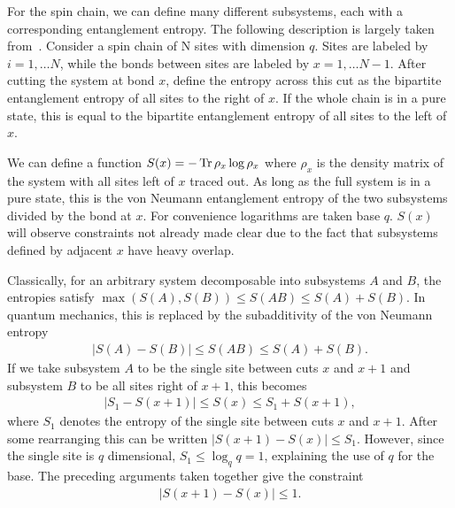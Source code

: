 For the spin chain, we can define many different subsystems, each with a corresponding entanglement entropy. The following description is largely taken from~\cite{Nahum2017}. Consider a spin chain of N sites with dimension $q$. Sites are labeled by $i=1,\dots N$, while the bonds between sites are labeled by $x = 1,\dots N-1$. After cutting the system at bond $x$, define the entropy across this cut as the bipartite entanglement entropy of all sites to the right of $x$. If the whole chain is in a pure state, this is equal to the bipartite entanglement entropy of all sites to the left of $x$.

We can define a function $S(x) = -\operatorname{Tr}\rho_x\log\rho_x$ where $\rho_x$ is the density matrix of the system with all sites left of $x$ traced out. As long as the full system is in a pure state, this is the von Neumann entanglement entropy of the two subsystems divided by the bond at $x$. For convenience logarithms are taken base $q$. $S(x)$ will observe constraints not already made clear due to the fact that subsystems defined by adjacent $x$ have heavy overlap.

Classically, for an arbitrary system decomposable into subsystems $A$ and $B$, the entropies satisfy $\max(S(A), S(B)) \leq S(AB)\leq S(A) + S(B)$. In quantum mechanics, this is replaced by the subadditivity of the von Neumann entropy 
\begin{align}
\left|S(A)-S(B)\right| \leq S(AB)\leq S(A) + S(B). \label{eqn:subadd}
\end{align}
If we take subsystem $A$ to be the single site between cuts $x$ and $x+1$ and subsystem $B$ to be all sites right of $x+1$, this becomes
\begin{align}
\left|S_1 - S(x+1)\right| \leq S(x) \leq S_1 + S(x+1),
\end{align}
where $S_1$ denotes the entropy of the single site between cuts $x$ and $x+1$. After some rearranging this can be written $\left|S(x+1) - S(x)\right| \leq S_1$. However, since the single site is $q$ dimensional, $S_1 \leq \log_q q = 1$, explaining the use of $q$ for the base. The preceding arguments taken together give the constraint
\begin{align}
\left|S(x+1) - S(x)\right| \leq 1. \label{eqn:offbyone}
\end{align}

